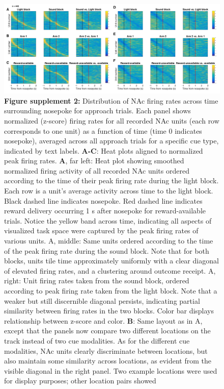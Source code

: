 \documentclass[11pt]{article}
\newcommand{\bsf}[1]{\textbf{#1}}
\begin{document}
 \begin{figure}[ht!]
\centering
\includegraphics[width=\textwidth]{Fig 8 - SUPP NP Task tiling.pdf}
\caption*{\bsf{Figure supplement 2:} Distribution of NAc firing rates across time surrounding nosepoke for approach
trials. Each panel shows normalized (z-score) firing rates for all recorded NAc units
(each row corresponds to one unit) as a function of time (time 0 indicates
nosepoke), averaged across all approach trials for a specific cue type,
indicated by text labels. \bsf{A-C}: Heat plots aligned to normalized peak firing rates. \bsf{A}, far left: Heat plot showing smoothed
normalized firing activity of all recorded NAc units ordered according to the
time of their peak firing rate during the light block. Each row is a unit’s
average activity across time to the light block. Black dashed line indicates
nosepoke. Red dashed line indicates reward delivery occurring 1 s after
nosepoke for reward-available trials. Notice the yellow band across time,
indicating all aspects of visualized task space were captured by the peak
firing rates of various units. A, middle: Same units ordered according to
the time of the peak firing rate during the sound block. Note that for both
blocks, units tile time approximately uniformly with a clear diagonal of
elevated firing rates, and a clustering around outcome receipt. A, right: Unit firing rates taken from the sound block, ordered according to peak
firing rate taken from the light block. Note that a weaker but still
discernible diagonal persists, indicating partial similarity between firing
rates in the two blocks. Color bar displays relationship between z-score and color. \bsf{B}: Same layout as in A, except
that the panels now compare two different locations on the track instead of
two cue modalities. As for the different cue modalities, NAc units clearly
discriminate between locations, but also maintain some similarity across
locations, as evident from the visible diagonal in the right panel. Two
example locations were used for display purposes; other location pairs showed
}
\end{figure}
\end{document}
